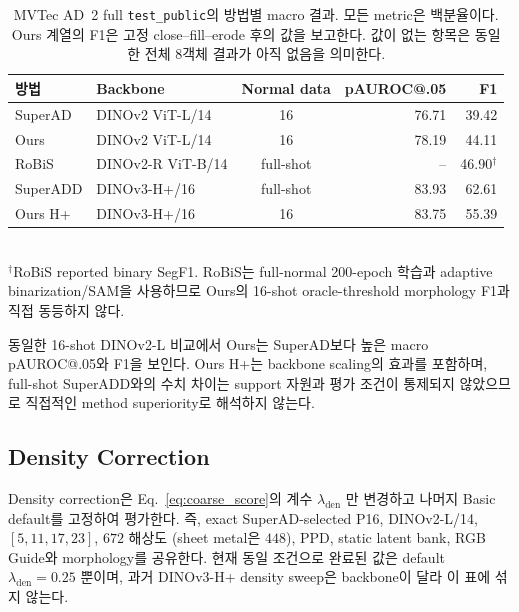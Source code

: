 \begin{table}[t]
  \centering
  \caption{MVTec AD~2 full \texttt{test\_public}의 방법별 macro 결과. 모든
  metric은 백분율이다. Ours 계열의 F1은 고정 close--fill--erode 후의 값을
  보고한다. 값이 없는 항목은 동일한 전체 8객체 결과가 아직 없음을 의미한다.}
  \label{tab:main_superad_comparison}
  \small
  \begin{tabular}{@{}llcrr@{}}
    \toprule
    방법 & Backbone & Normal data & pAUROC@.05 & F1 \\
    \midrule
    SuperAD  & DINOv2 ViT-L/14   & 16        & 76.71 & 39.42 \\
    Ours     & DINOv2 ViT-L/14   & 16        & 78.19 & 44.11 \\
    \midrule
    RoBiS~\cite{li2025robis} & DINOv2-R ViT-B/14 & full-shot & -- & 46.90$^{\dagger}$ \\
    \midrule
    SuperADD & DINOv3-H+/16      & full-shot & 83.93 & 62.61 \\
    Ours H+  & DINOv3-H+/16      & 16        & 83.75 & 55.39 \\
    \bottomrule
  \end{tabular}
  \\[2pt]\footnotesize $^{\dagger}$RoBiS reported binary SegF1. RoBiS는
  full-normal 200-epoch 학습과 adaptive binarization/SAM을 사용하므로 Ours의
  16-shot oracle-threshold morphology F1과 직접 동등하지 않다.
\end{table}

동일한 16-shot DINOv2-L 비교에서 Ours는 SuperAD보다 높은 macro
pAUROC@.05와 F1을 보인다. Ours H+는 backbone scaling의 효과를 포함하며,
full-shot SuperADD와의 수치 차이는 support 자원과 평가 조건이 통제되지 않았으므로
직접적인 method superiority로 해석하지 않는다.

\subsection{Density Correction}

Density correction은 Eq.~\eqref{eq:coarse_score}의 계수 $\lambda_{\mathrm{den}}$
만 변경하고 나머지 Basic default를 고정하여 평가한다. 즉, exact
SuperAD-selected P16, DINOv2-L/14, $[5,11,17,23]$, $672$ 해상도
(sheet metal은 $448$), PPD, static latent bank, RGB Guide와 morphology를
공유한다. 현재 동일 조건으로 완료된 값은 default $\lambda_{\mathrm{den}}=0.25$
뿐이며, 과거 DINOv3-H+ density sweep은 backbone이 달라 이 표에 섞지 않는다.

